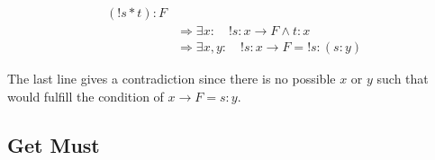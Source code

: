 \begin{equation}\label{bb}
\begin{split}
	(!s*t):F  \\
	& \Rightarrow \exists x : \quad !s: x \rightarrow F \land t: x\\
	& \Rightarrow \exists x,y : \quad !s: x \rightarrow F = !s:(s:y)
\end{split}
\end{equation}

The last line gives a contradiction since there is no possible $x$ or $y$ such that would fulfill the condition of $x \rightarrow F = s:y$.



\subsection{Get Must}
